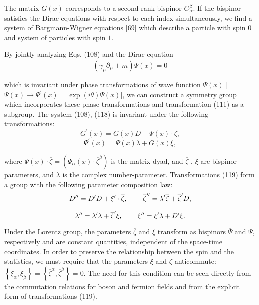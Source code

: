 \documentclass[a4paper,12pt]{article}
\begin{document}
The matrix $G(x)$ corresponds to a second-rank bispinor $G_\alpha
^\beta $. If the bispinor satisfies the Dirac equations with
respect to each index simultaneously, we find a system of
Bargmann-Wigner equations [69] which describe a particle with spin
$0$ and system of particles with spin $1$.

By jointly analyzing Eqs. (108) and the Dirac equation
\begin{equation}
\left( \gamma _\mu \partial _\mu +m\right) \Psi (x)=0  \label{118}
\end{equation}

which is invariant under phase transformations of wave function
$\Psi (x)$ [$ \Psi (x)\rightarrow \Psi ^{\prime }(x)=\exp (i\theta
)\Psi (x)$], we can construct a symmetry group which incorporates
these phase transformations and transformation (111) as a
subgroup. The system (108), (118) is invariant under the following
transformations:
\[
G^{\prime }(x)=G(x)D+\Psi (x)\cdot \overline{\zeta } ,
\]
\vspace{-8mm}
\begin{equation}  \label{119}
\end{equation}
\vspace{-8mm}
\[
\Psi ^{\prime }(x)=\Psi (x)\lambda +G(x)\xi ,
\]

where $\Psi (x)\cdot \overline{\zeta }=\left( \Psi _\alpha
(x)\cdot \overline{\zeta }^\beta \right) $ is the matrix-dyad, and
$\overline{\zeta }$ , $\xi $ are bispinor-parameters, and $\lambda
$ is the complex number-parameter. Transformations (119) form a
group with the following parameter composition law:
\[
D^{\prime \prime }=D^{\prime }D+\xi ^{\prime }\cdot
\overline{\zeta } ,\hspace{0.3in}\overline{\zeta }^{\prime \prime
}=\lambda ^{\prime }\overline{ \zeta }+\overline{\zeta }^{\prime
}D ,
\]
\vspace{-8mm}
\begin{equation}  \label{120}
\end{equation}
\vspace{-8mm}
\[
\lambda ^{\prime \prime }=\lambda ^{\prime }\lambda
+\overline{\zeta } ^{\prime }\xi  ,\hspace{0.3in}\xi ^{\prime
\prime }=\xi ^{\prime }\lambda +D^{\prime }\xi .
\]

Under the Lorentz group, the parameters $\overline{\zeta }$ and
$\xi $ transform as bispinors $\overline{\Psi }$ and $\Psi $,
respectively and are constant quantities, independent of the
space-time coordinates. In order to preserve the relationship
between the spin and the statistics, we must require that the
parameters $\xi $ and $\zeta $ anticommute: $\left\{ \xi _\alpha
,\xi _\beta \right\} =\left\{ \overline{\zeta }^\alpha ,\overline{
\zeta }^\beta \right\} =0$. The need for this condition can be
seen directly from the commutation relations for boson and fermion
fields and from the explicit form of transformations (119).
\end{document}
